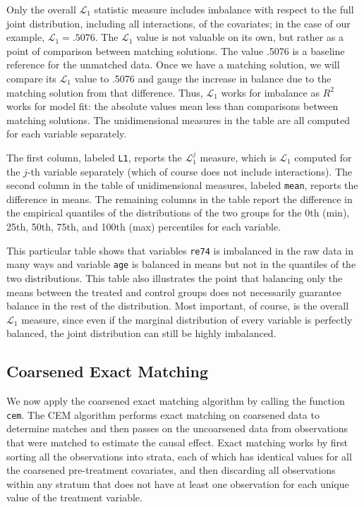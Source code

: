 \documentclass[11pt]{article}
\begin{document}
Only the overall $\mathcal L_1$ statistic measure includes imbalance with
respect to the full joint distribution, including all interactions, of the
covariates; in the case of our example, $\mathcal L_1=.5076$. The
$\mathcal L_1$ value is not valuable on its own, but rather as a point of
comparison between matching solutions. The value .5076 is a baseline
reference for the unmatched data. Once we have a matching solution, we
will compare its $\mathcal L_1$ value to .5076 and gauge the increase in
balance due to the matching solution from that difference. Thus, $\mathcal
L_1$ works for imbalance as $R^2$ works for model fit: the absolute values
mean less than comparisons between matching solutions. The unidimensional
measures in the table are all computed for each variable separately.

The first column, labeled \texttt{L1}, reports the $\mathcal L_1^j$
measure, which is $\mathcal L_1$ computed for the $j$-th variable
separately (which of course does not include interactions).  The second
column in the table of unidimensional measures, labeled \texttt{mean},
reports the difference in means.  The remaining columns in the table
report the difference in the empirical quantiles of the distributions of
the two groups for the 0th (min), 25th, 50th, 75th, and 100th (max)
percentiles for each variable. 

This particular table shows that variables \texttt{re74} is imbalanced in
the raw data in many ways and variable \texttt{age} is balanced in means
but not in the quantiles of the two distributions.  This table also
illustrates the point that balancing only the means between the treated
and control groups does not necessarily guarantee balance in the rest of
the distribution.  Most important, of course, is the overall $\mathcal
L_1$ measure, since even if the marginal distribution of every variable is
perfectly balanced, the joint distribution can still be highly imbalanced.

\subsection{Coarsened Exact Matching}\label{sec:cem}

We now apply the coarsened exact matching algorithm by calling the
function \texttt{cem}.  The CEM algorithm performs exact matching on
coarsened data to determine matches and then passes on the uncoarsened
data from observations that were matched to estimate the causal
effect.  Exact matching works by first sorting all the observations
into strata, each of which has identical values for all the coarsened
pre-treatment covariates, and then discarding all observations within
any stratum that does not have at least one observation for each
unique value of the treatment variable.
\end{document}
